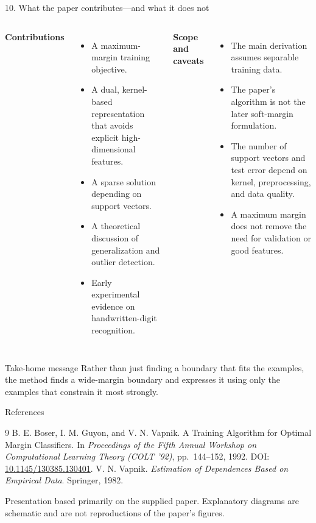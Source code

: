 \documentclass[10pt,compress]{beamer}
\begin{document}
\begin{frame}{10. What the paper contributes—and what it does not}\scriptsize
\begin{columns}[T]
\textbf{Contributions}
\begin{itemize}\scriptsize
\item A maximum-margin training objective.
\item A dual, kernel-based representation that avoids explicit high-dimensional features.
\item A sparse solution depending on support vectors.
\item A theoretical discussion of generalization and outlier detection.
\item Early experimental evidence on handwritten-digit recognition.
\end{itemize}
\textbf{Scope and caveats}
\begin{itemize}\scriptsize
\item The main derivation assumes separable training data.
\item The paper's algorithm is not the later soft-margin formulation.
\item The number of support vectors and test error depend on kernel, preprocessing, and data quality.
\item A maximum margin does not remove the need for validation or good features.
\end{itemize}
\end{columns}
\begin{block}{Take-home message}
\small Rather than just finding a boundary that fits the examples, the method finds a wide-margin boundary and expresses it using only the examples that constrain it most strongly.
\end{block}

\end{frame}

\begin{frame}{References}
\footnotesize
\begin{thebibliography}{9}
B. E. Boser, I. M. Guyon, and V. N. Vapnik.
\newblock A Training Algorithm for Optimal Margin Classifiers.
\newblock In \emph{Proceedings of the Fifth Annual Workshop on Computational Learning Theory (COLT '92)}, pp.~144--152, 1992.
\newblock DOI: \href{https://doi.org/10.1145/130385.130401}{10.1145/130385.130401}.
V. N. Vapnik.
\newblock \emph{Estimation of Dependences Based on Empirical Data}.
\newblock Springer, 1982.
\end{thebibliography}
\vfill
\small Presentation based primarily on the supplied paper. Explanatory diagrams are schematic and are not reproductions of the paper's figures.
\end{frame}
\end{document}

